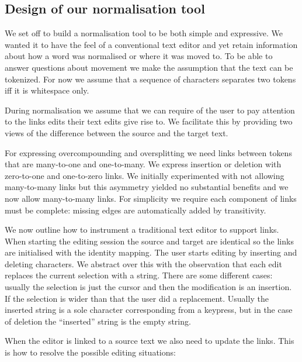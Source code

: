 \documentclass[10pt, a4paper]{article}
\begin{document}
\subsection{Design of our normalisation tool}

We set off to build a normalisation tool to be both simple and expressive.
We wanted it to have the feel of a conventional text editor and yet retain
information about how a word was normalised or where it was moved to.
To be able to answer questions about movement we make the assumption that
the text can be tokenized. For now we assume that a sequence of characters
separates two tokens iff it is whitespace only.

During normalisation we assume that we can require of the user to pay attention
to the links edits their text edits give rise to. We facilitate this by
providing two views of the difference between the source and the target text.

For expressing overcompounding and oversplitting we need links between tokens
that are many-to-one and one-to-many. We express insertion or deletion with
zero-to-one and one-to-zero links. We initially experimented with not allowing
many-to-many links but this asymmetry yielded no substantial benefits
and we now allow many-to-many links.
For simplicity we require each component
of links must be complete: missing edges are automatically added by
transitivity.

We now outline how to instrument a traditional text editor to support links.
When starting the editing session the source and target are identical so the
links are initialised with the identity mapping. The user starts editing
by inserting and deleting characters. We abstract over this with the observation
that each edit replaces the current selection with a string. There are
some different cases: usually the selection is just the cursor and then the
modification is an insertion. If the selection is wider than that the user
did a replacement. Usually the inserted string is a sole character corresponding
from a keypress, but in the case of deletion the ``inserted'' string is the
empty string.

When the editor is linked to a source text we also need to update the links.
This is how to resolve the possible editing situations:
\end{document}
